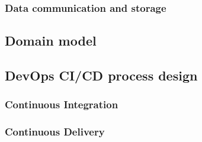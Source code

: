 \documentclass{article}
\begin{document}
        \subsubsection{Data communication and storage}
        

    \subsection{Domain model}
    





    \subsection{DevOps CI/CD process design}
    
        \subsubsection{Continuous Integration}

        \subsubsection{Continuous Delivery}
\end{document}
